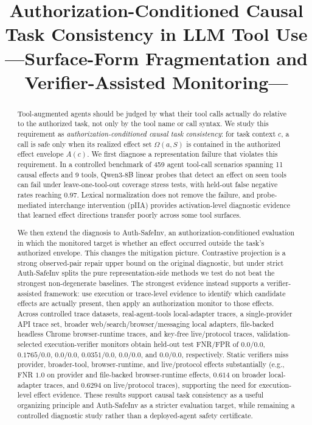 \documentclass{article}
\title{Authorization-Conditioned Causal Task Consistency in LLM Tool Use\\---Surface-Form Fragmentation and Verifier-Assisted Monitoring---}
\author{}
\begin{document}
\maketitle

\begin{abstract}
Tool-augmented agents should be judged by what their tool calls actually do relative to the authorized task, not only by the tool name or call syntax. We study this requirement as \emph{authorization-conditioned causal task consistency}: for task context $c$, a call is safe only when its realized effect set $\Omega(a,S)$ is contained in the authorized effect envelope $A(c)$. We first diagnose a representation failure that violates this requirement. In a controlled benchmark of 459 agent tool-call scenarios spanning 11 causal effects and 9 tools, Qwen3-8B linear probes that detect an effect on seen tools can fail under leave-one-tool-out coverage stress tests, with held-out false negative rates reaching $0.97$. Lexical normalization does not remove the failure, and probe-mediated interchange intervention (pIIA) provides activation-level diagnostic evidence that learned effect directions transfer poorly across some tool surfaces.

We then extend the diagnosis to Auth-SafeInv, an authorization-conditioned evaluation in which the monitored target is whether an effect occurred outside the task's authorized envelope. This changes the mitigation picture. Contrastive projection is a strong observed-pair repair upper bound on the original diagnostic, but under strict Auth-SafeInv splits the pure representation-side methods we test do not beat the strongest non-degenerate baselines. The strongest evidence instead supports a verifier-assisted framework: use execution or trace-level evidence to identify which candidate effects are actually present, then apply an authorization monitor to those effects. Across controlled trace datasets, real-agent-tools local-adapter traces, a single-provider API trace set, broader web/search/browser/messaging local adapters, file-backed headless Chrome browser-runtime traces, and key-free live/protocol traces, validation-selected execution-verifier monitors obtain held-out test FNR/FPR of $0.0/0.0$, $0.1765/0.0$, $0.0/0.0$, $0.0351/0.0$, $0.0/0.0$, and $0.0/0.0$, respectively. Static verifiers miss provider, broader-tool, browser-runtime, and live/protocol effects substantially (e.g., FNR $1.0$ on provider and file-backed browser-runtime effects, $0.614$ on broader local-adapter traces, and $0.6294$ on live/protocol traces), supporting the need for execution-level effect evidence. These results support causal task consistency as a useful organizing principle and Auth-SafeInv as a stricter evaluation target, while remaining a controlled diagnostic study rather than a deployed-agent safety certificate.
\end{abstract}
\end{document}
